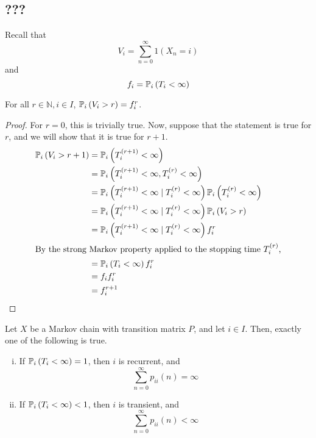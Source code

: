 \subsection{???}
Recall that
\[ V_i = \sum_{n=0}^\infty 1(X_n = i) \]
and
\[ f_i = \mathbb{P}_{i}\left({T_i < \infty}\right) \]
\begin{lemma}
    For all \( r \in \mathbb N, i \in I \), \( \mathbb{P}_{i}\left({V_i > r}\right) = f_i^r \).
\end{lemma}
\begin{proof}
    For \( r = 0 \), this is trivially true.
    Now, suppose that the statement is true for \( r \), and we will show that it is true for \( r + 1 \).
    \begin{align*}
        \mathbb{P}_{i}\left({V_i > r+1}\right) &= \mathbb{P}_{i}\left({T_i^{(r+1)} < \infty}\right) \\
        &= \mathbb{P}_{i}\left({T_i^{(r+1)} < \infty, T_i^{(r)} < \infty}\right) \\
        &= \mathbb{P}_{i}\left({T_i^{(r+1)} < \infty \mid T_i^{(r)} < \infty}\right) \mathbb{P}_{i}\left({T_i^{(r)} < \infty}\right) \\
        &= \mathbb{P}_{i}\left({T_i^{(r+1)} < \infty \mid T_i^{(r)} < \infty}\right) \mathbb{P}_{i}\left({V_i > r}\right) \\
        &= \mathbb{P}_{i}\left({T_i^{(r+1)} < \infty \mid T_i^{(r)} < \infty}\right) f_i^r \\
        \intertext{By the strong Markov property applied to the stopping time \( T_i^{(r)} \),}
        &= \mathbb{P}_{i}\left({T_i < \infty}\right) f_i^r \\
        &= f_i f_i^r \\
        &= f_i^{r+1}
    \end{align*}
\end{proof}
\begin{theorem}
    Let \( X \) be a Markov chain with transition matrix \( P \), and let \( i \in I \).
    Then, exactly one of the following is true.
    \begin{enumerate}[(i)]
        \item If \( \mathbb{P}_{i}\left({T_i < \infty}\right) = 1 \), then \( i \) is recurrent, and
        \[ \sum_{n=0}^\infty p_{ii}(n) = \infty \]
        \item If \( \mathbb{P}_{i}\left({T_i < \infty}\right) < 1 \), then \( i \) is transient, and
        \[ \sum_{n=0}^\infty p_{ii}(n) < \infty \]
    \end{enumerate}
\end{theorem}
